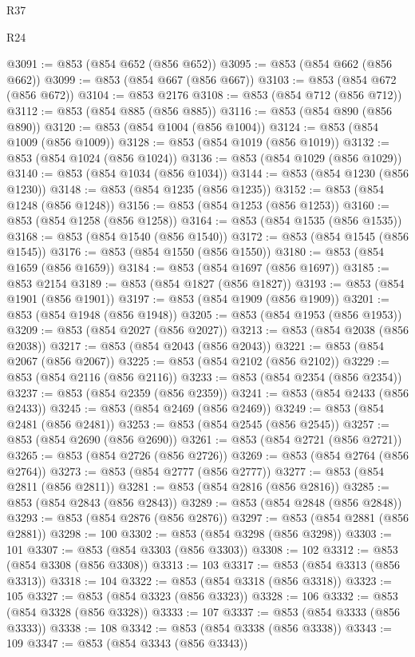 \begin{lexlean}{R37}
\begin{lexlean}{R24}
\begin{coremodule}
{{{{{{{{{{{{{{{{{{{{{{{{{{{{{{{{{{{{{{{{{{{{{{{{{{{{{{{{{{{{{{{{{{{{{{{{{{{{{{{{{{{{{{{{{{{{{{{{{{{{{{{{{{{{{{{{{{{{{{{{{{{{{{{{{{{{{{{{{{{{{{{{{{{{{{{{{{{{{{{{{{{{{{{{{{{{{{{{{{{{{{{{{@3091 := @853 (@854 @652 (@856 @652))
@3095 := @853 (@854 @662 (@856 @662))
@3099 := @853 (@854 @667 (@856 @667))
@3103 := @853 (@854 @672 (@856 @672))
@3104 := @853 @2176
@3108 := @853 (@854 @712 (@856 @712))
@3112 := @853 (@854 @885 (@856 @885))
@3116 := @853 (@854 @890 (@856 @890))
@3120 := @853 (@854 @1004 (@856 @1004))
@3124 := @853 (@854 @1009 (@856 @1009))
@3128 := @853 (@854 @1019 (@856 @1019))
@3132 := @853 (@854 @1024 (@856 @1024))
@3136 := @853 (@854 @1029 (@856 @1029))
@3140 := @853 (@854 @1034 (@856 @1034))
@3144 := @853 (@854 @1230 (@856 @1230))
@3148 := @853 (@854 @1235 (@856 @1235))
@3152 := @853 (@854 @1248 (@856 @1248))
@3156 := @853 (@854 @1253 (@856 @1253))
@3160 := @853 (@854 @1258 (@856 @1258))
@3164 := @853 (@854 @1535 (@856 @1535))
@3168 := @853 (@854 @1540 (@856 @1540))
@3172 := @853 (@854 @1545 (@856 @1545))
@3176 := @853 (@854 @1550 (@856 @1550))
@3180 := @853 (@854 @1659 (@856 @1659))
@3184 := @853 (@854 @1697 (@856 @1697))
@3185 := @853 @2154
@3189 := @853 (@854 @1827 (@856 @1827))
@3193 := @853 (@854 @1901 (@856 @1901))
@3197 := @853 (@854 @1909 (@856 @1909))
@3201 := @853 (@854 @1948 (@856 @1948))
@3205 := @853 (@854 @1953 (@856 @1953))
@3209 := @853 (@854 @2027 (@856 @2027))
@3213 := @853 (@854 @2038 (@856 @2038))
@3217 := @853 (@854 @2043 (@856 @2043))
@3221 := @853 (@854 @2067 (@856 @2067))
@3225 := @853 (@854 @2102 (@856 @2102))
@3229 := @853 (@854 @2116 (@856 @2116))
@3233 := @853 (@854 @2354 (@856 @2354))
@3237 := @853 (@854 @2359 (@856 @2359))
@3241 := @853 (@854 @2433 (@856 @2433))
@3245 := @853 (@854 @2469 (@856 @2469))
@3249 := @853 (@854 @2481 (@856 @2481))
@3253 := @853 (@854 @2545 (@856 @2545))
@3257 := @853 (@854 @2690 (@856 @2690))
@3261 := @853 (@854 @2721 (@856 @2721))
@3265 := @853 (@854 @2726 (@856 @2726))
@3269 := @853 (@854 @2764 (@856 @2764))
@3273 := @853 (@854 @2777 (@856 @2777))
@3277 := @853 (@854 @2811 (@856 @2811))
@3281 := @853 (@854 @2816 (@856 @2816))
@3285 := @853 (@854 @2843 (@856 @2843))
@3289 := @853 (@854 @2848 (@856 @2848))
@3293 := @853 (@854 @2876 (@856 @2876))
@3297 := @853 (@854 @2881 (@856 @2881))
@3298 := 100
@3302 := @853 (@854 @3298 (@856 @3298))
@3303 := 101
@3307 := @853 (@854 @3303 (@856 @3303))
@3308 := 102
@3312 := @853 (@854 @3308 (@856 @3308))
@3313 := 103
@3317 := @853 (@854 @3313 (@856 @3313))
@3318 := 104
@3322 := @853 (@854 @3318 (@856 @3318))
@3323 := 105
@3327 := @853 (@854 @3323 (@856 @3323))
@3328 := 106
@3332 := @853 (@854 @3328 (@856 @3328))
@3333 := 107
@3337 := @853 (@854 @3333 (@856 @3333))
@3338 := 108
@3342 := @853 (@854 @3338 (@856 @3338))
@3343 := 109
@3347 := @853 (@854 @3343 (@856 @3343))
}}}}}}}}}}}}}}}}}}}}}}}}}}}}}}}}}}}}}}}}}}}}}}}}}}}}}}}}}}}}}}}}}}}}}}}}}}}}}}}}}}}}}}}}}}}}}}}}}}}}}}}}}}}}}}}}}}}}}}}}}}}}}}}}}}}}}}}}}}}}}}}}}}}}}}}}}}}}}}}}}}}}}}}}}}}}}}}}}}}}}}}}}
\end{coremodule}
\end{lexlean}
\end{lexlean}
